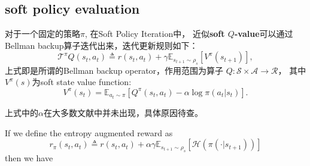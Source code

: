 \subsection{soft policy evaluation}

\cite{YZhang2020}
\parencite{YZhang2020}


对于一个固定的策略$\pi$, 在Soft Policy Iteration中，
近似{\bf soft $Q$-value}可以通过Bellman backup算子迭代出来，迭代更新规则如下：
\begin{equation}\label{soft_policy_evaluation}
\mathcal{T}^\pi Q(s_t, a_t) \triangleq r(s_t, a_t) 
+ \gamma \mathbb{E}_{s_{t+1}\sim\rho_s} [V^\pi(s_{t+1})],
\end{equation}
上式即是所谓的Bellman backup operator，作用范围为算子
$Q: \mathcal{S} \times \mathcal{A} \rightarrow \mathcal{R}$，
其中$V^\pi(s)$为soft state value function:
$$
V^\pi(s_t) = \mathbb{E}_{a_t\sim\pi}[Q^\pi(s_t,a_t)-\alpha\log\pi(a_t|s_t)].
$$
\begin{emp_box}
上式中的$\alpha$在大多数文献中并未出现，具体原因待查。
\end{emp_box}
If we define the entropy augmented reward as
$$
r_\pi(s_t,a_t) \triangleq r(s_t, a_t) 
+ \alpha\gamma \mathbb{E}_{s_{t+1}\sim\rho_s}
\left[ \mathcal{H}\left( \pi(\cdot | s_{t+1}) \right) \right]
$$
then we have
